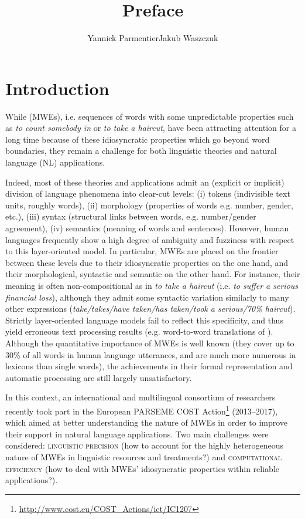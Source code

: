 \documentclass[output=paper]{langsci/langscibook}
\title{Preface}
\author{Yannick Parmentier\affiliation{University of Orléans\\University of Lorraine}\lastand Jakub Waszczuk\affiliation{University of Tours\\University of Düsseldorf}}
\begin{document}
\section{Introduction} 
While  (MWEs), i.e. sequences of words with some
unpredictable properties such as \textit{to count somebody in} or
\textit{to take a haircut}, have been attracting attention for a long
time because of these idiosyncratic properties which go beyond word
boundaries, they remain a challenge for both linguistic theories and
natural language (NL) applications.

Indeed, most of these theories and applications admit an (explicit or
implicit) division of language phenomena into clear-cut levels:
(i) tokens (indivisible text units, roughly words),
(ii) morphology (properties of words e.g. number, gender, etc.),
(iii) syntax (structural links between words, e.g. number/gender agreement),
(iv) semantics (meaning of words and sentences).
However, human languages frequently show a high degree of ambiguity
and fuzziness with respect to this layer-oriented model. In
particular, MWEs are placed on the frontier between these levels due
to their idiosyncratic properties on the one hand, and their
morphological, syntactic and semantic  on the other
hand. For instance, their meaning is often non-compositional as in \textit{to
take a haircut} (i.e. \textit{to suffer a serious financial loss}), although
they admit some syntactic variation similarly to many other
expressions (\textit{take/takes/have taken/has taken/took a serious/70\%
haircut}). Strictly layer-oriented language models fail to reflect
this specificity, and thus yield erroneous text processing results
(e.g. word-to-word translations of ). Although the quantitative
importance of MWEs is well known (they cover up to 30\% of all words
in human language utterances, and are much more numerous in lexicons
than single words), the achievements in their formal representation
and automatic processing are still largely unsatisfactory.

In this context, an international and multilingual consortium of
researchers recently took part in the European PARSEME COST
Action\footnote{\url{http://www.cost.eu/COST_Actions/ict/IC1207}}
(2013--2017), which aimed at better understanding the nature of MWEs in
order to improve their support in natural language applications. Two
main challenges were considered: \textsc{linguistic precision} (how to
account for the highly heterogeneous nature of MWEs in linguistic
resources and treatments?) and \textsc{computational efficiency} (how to
deal with MWEs' idiosyncratic properties within reliable applications?).
\end{document}

